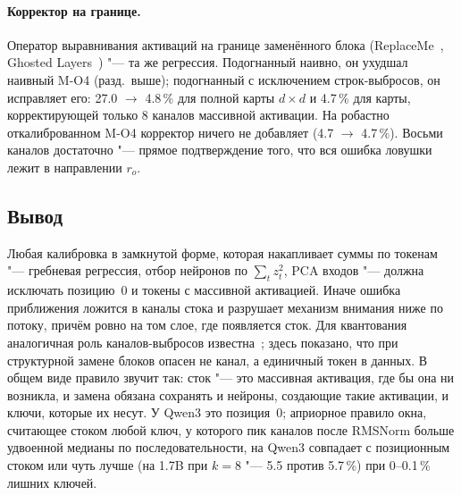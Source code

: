 \begin{table}[t]
\centering
\small
{}
\caption{Наивная и робастная калибровка при $k=k_{\mathrm{sink}}$
(Qwen3-0.6B, WikiText-2, 32 окна). Методы ранжирования и отбеливания
(SVD-LLM, ASVD, A3) не меняются; регрессионные замены меняются в
разы.}
\label{tab:robust}
\end{table}

\paragraph{Корректор на границе.} Оператор выравнивания активаций на
границе заменённого блока (ReplaceMe~\cite{shopkhoev2025replaceme},
Ghosted Layers~\cite{yun2026ghosted}) "--- та же регрессия. Подогнанный
наивно, он ухудшал наивный M-O4 (разд.~выше); подогнанный с исключением
строк-выбросов, он исправляет его: 27.0 $\to$ 4.8\,\% для полной карты
$d\times d$ и 4.7\,\% для карты, корректирующей только 8 каналов массивной
активации. На робастно откалиброванном M-O4 корректор ничего не добавляет
(4.7 $\to$ 4.7\,\%). Восьми каналов достаточно "--- прямое подтверждение
того, что вся ошибка ловушки лежит в направлении $r_o$.

\subsection{Вывод}

Любая калибровка в замкнутой форме, которая накапливает суммы по
токенам "--- гребневая регрессия, отбор нейронов по $\sum_t z_t^2$,
PCA входов "--- должна исключать позицию~0 и токены с массивной
активацией. Иначе ошибка приближения ложится в каналы стока и разрушает
механизм внимания ниже по потоку, причём ровно на том слое, где
появляется сток. Для квантования аналогичная роль каналов-выбросов
известна~\cite{yuan2023asvd}; здесь показано, что при структурной
замене блоков опасен не канал, а единичный токен в данных. В общем виде
правило звучит так: сток "--- это массивная активация, где бы она ни
возникла, и замена обязана сохранять и нейроны, создающие такие активации,
и ключи, которые их несут. У Qwen3 это позиция~0; априорное правило окна,
считающее стоком любой ключ, у которого пик каналов после RMSNorm больше
удвоенной медианы по последовательности, на Qwen3 совпадает с позиционным
стоком или чуть лучше (на 1.7B при $k=8$ "--- 5.5 против 5.7\,\%) при
0--0.1\,\% лишних ключей.
